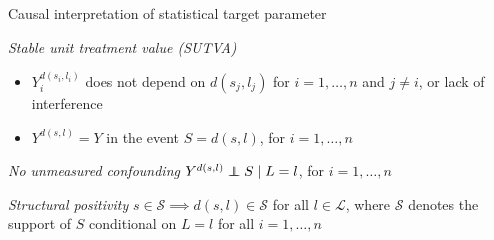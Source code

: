 \documentclass{beamer}
\begin{document}

\begin{frame}[c]{Causal interpretation of statistical target parameter}

\begin{center}
\begin{tcolorbox}
\begin{assumption}{1}{\textit{Stable unit treatment value (SUTVA)}}\label{sutva}
  \begin{itemize}
    \itemsep2pt
    \item $Y^{d(s_i, l_i)}_i$ does not depend on $d(s_j, l_j)$ for
        $i = 1, \ldots, n$ and $j \neq i$, or lack of
        interference~\citep{cox1958planning, rubin1974estimating}
     \item $Y^{d(s, l)} = Y$ in the event $S = d(s, l)$, for $i = 1, \ldots, n$
  \end{itemize}
\end{assumption}
\end{tcolorbox}
\vspace{-0.7em}
\begin{tcolorbox}
\begin{assumption}{2}{\textit{No unmeasured confounding}}\label{ignorability}
  $Y^{d(s, l)} \indep S \mid L = l$, for $i = 1, \ldots, n$
\end{assumption}
\end{tcolorbox}
\vspace{-0.7em}
\begin{tcolorbox}
\begin{assumption}{3}{\textit{Structural positivity}}\label{positivity}
  $s \in \mathcal{S} \implies d(s, l) \in \mathcal{S}$ for all
  $l \in \mathcal{L}$, where $\mathcal{S}$ denotes the support of $S$
  conditional on $L = l$ for all $i = 1, \ldots, n$
\end{assumption}
\end{tcolorbox}
\end{center}


\end{frame}
\end{document}
